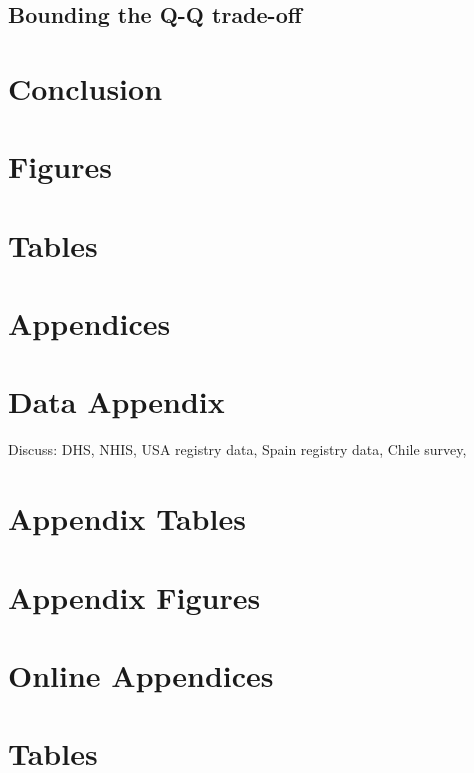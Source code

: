 \documentclass[subeqn]{article}
\begin{document}
\begin{spacing}{1.4}
\subsection{Bounding the Q-Q trade-off}            \label{TWINsscn:resultBounds}



\section{Conclusion}                               \label{TWINscn:conclusion}

\newpage
\section*{Figures}


\clearpage
\section*{Tables}

\clearpage




\newpage
\appendix
\section*{Appendices}
\section{Data Appendix}
Discuss: DHS, NHIS, USA registry data, Spain registry data, Chile survey, 

\newpage
\end{spacing}

\section{Appendix Tables}

\newpage

\section{Appendix Figures}


\newpage
\appendix
\section*{Online Appendices}
\section{Tables}

\end{document}

